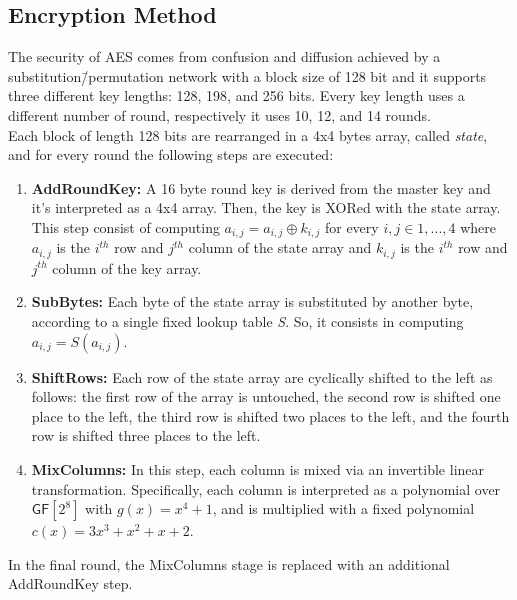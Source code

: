 \subsection{Encryption Method}
The security of AES comes from confusion and diffusion achieved by a substitution\=/permutation network with a block size of 128 bit and it supports three different key lengths: 128, 198, and 256 bits. Every key length uses a different number of round, respectively it uses 10, 12, and 14 rounds.\\
Each block of length 128 bits are rearranged in a 4x4 bytes array, called \emph{state}, and for every round the following steps are executed:
\begin{enumerate}
    \item{\textbf{AddRoundKey:} A 16 byte round key is derived from the master key and it's interpreted as a 4x4 array. Then, the key is XORed with the state array.\\This step consist of computing $a_{i,j} = a_{i,j} \oplus k_{i,j}$ for every $i,j \in {1,...,4}$ where $a_{i,j}$ is the $i^{th}$ row and $j^{th}$ column of the state array and $k_{i,j}$ is the $i^{th}$ row and $j^{th}$ column of the key array.}
    \item{\textbf{SubBytes:} Each byte of the state array is substituted by another byte, according to a single fixed lookup table \emph{S}. So, it consists in computing $a_{i,j} = S(a_{i,j})$.}
    \item{\textbf{ShiftRows:} Each row of the state array are cyclically shifted to the left as follows: the first row of the array is untouched, the second row is shifted one place to the left, the third row is shifted two places to the left, and the fourth row is shifted three places to the left.}
    \item{\textbf{MixColumns:} In this step, each column is mixed via an invertible linear transformation. Specifically, each column is interpreted as a polynomial over $\mathsf{GF}[2^8]$ with $g(x) = x^4 + 1$, and is multiplied with a fixed polynomial $c(x) = 3x^3 + x^2 + x + 2$.}
\end{enumerate}
In the final round, the MixColumns stage is replaced with an additional AddRoundKey step.
